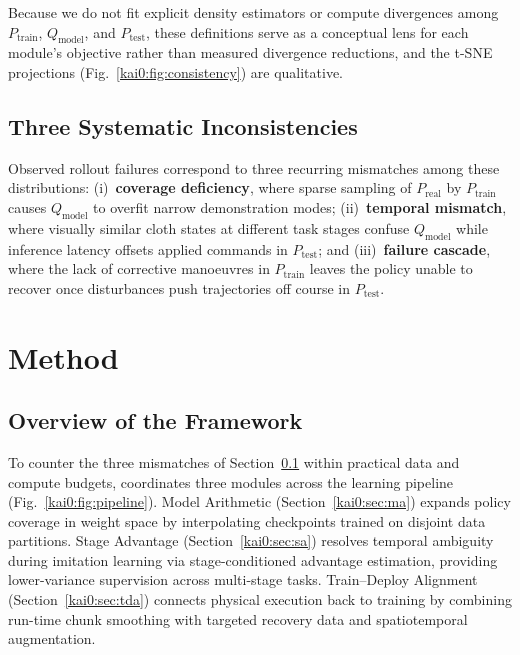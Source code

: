 Because we do not fit explicit density estimators or compute divergences among $P_{\mathrm{train}}$, $Q_{\mathrm{model}}$, and $P_{\mathrm{test}}$, these definitions serve as a conceptual lens for each module's objective rather than measured divergence reductions, and the t-SNE projections (Fig.~\ref{kai0:fig:consistency}) are qualitative.

\subsection{Three Systematic Inconsistencies}\label{kai0:sec:inconsistencies}
Observed rollout failures correspond to three recurring mismatches among these distributions: (i)~\textbf{coverage deficiency}, where sparse sampling of $P_{\mathrm{real}}$ by $P_{\mathrm{train}}$ causes $Q_{\mathrm{model}}$ to overfit narrow demonstration modes; (ii)~\textbf{temporal mismatch}, where visually similar cloth states at different task stages confuse $Q_{\mathrm{model}}$ while inference latency offsets applied commands in $P_{\mathrm{test}}$; and (iii)~\textbf{failure cascade}, where the lack of corrective manoeuvres in $P_{\mathrm{train}}$ leaves the policy unable to recover once disturbances push trajectories off course in $P_{\mathrm{test}}$.

\section{Method}\label{kai0:sec:method}

\subsection{Overview of the Framework}\label{kai0:sec:pipeline}
To counter the three mismatches of Section~\ref{kai0:sec:inconsistencies} within practical data and compute budgets, \chiz coordinates three modules across the learning pipeline (Fig.~\ref{kai0:fig:pipeline}). Model Arithmetic (Section~\ref{kai0:sec:ma}) expands policy coverage in weight space by interpolating checkpoints trained on disjoint data partitions. Stage Advantage (Section~\ref{kai0:sec:sa}) resolves temporal ambiguity during imitation learning via stage-conditioned advantage estimation, providing lower-variance supervision across multi-stage tasks. Train--Deploy Alignment (Section~\ref{kai0:sec:tda}) connects physical execution back to training by combining run-time chunk smoothing with targeted recovery data and spatiotemporal augmentation.


